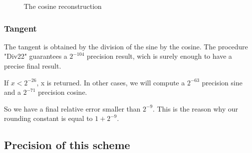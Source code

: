 \begin{figure}[htbp]
  \begin{center}
    \small \setlength{\unitlength}{3ex} 
    \end{center}\centering
    
    \caption{The cosine reconstruction}
    \label{fig:cosine-reconstruction}
  \end{figure}


\subsubsection{Tangent}

The tangent is obtained by the division of the sine by the cosine.
The procedure "Div22" guarantees a $2^{-104}$ precision result, wich is surely enough to have a precise final result.

If $x < 2^{-26}$, x is returned.
In other cases, we will compute a $2^{-63}$ precision sine and a $2^{-71}$ precision cosine.


So we have a final relative error smaller than $2^{-9}$. This is the
reason why our rounding constant is equal to $1+2^{-9}$.

\subsection{Precision of this scheme}

